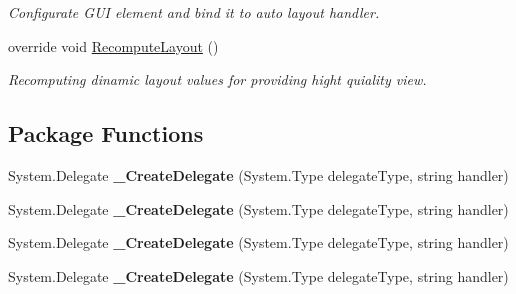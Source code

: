 \begin{DoxyCompactItemize}
\begin{DoxyCompactList}\small\item\em Configurate G\+UI element and bind it to auto layout handler. \end{DoxyCompactList}\item 
override void \mbox{\hyperlink{class_wpf_handler_1_1_u_i_1_1_controls_1_1_flat_text_box_af96bd0b4244565a1ca7a137d56296cda}{Recompute\+Layout}} ()
\begin{DoxyCompactList}\small\item\em Recomputing dinamic layout values for providing hight quiality view. \end{DoxyCompactList}\end{DoxyCompactItemize}
\subsection*{Package Functions}
\begin{DoxyCompactItemize}
\item 
\mbox{\label{class_wpf_handler_1_1_u_i_1_1_controls_1_1_flat_text_box_ad95fca5f96c4d3511458804f21944c87}} 
System.\+Delegate {\bfseries \+\_\+\+Create\+Delegate} (System.\+Type delegate\+Type, string handler)
\item 
\mbox{\label{class_wpf_handler_1_1_u_i_1_1_controls_1_1_flat_text_box_ad95fca5f96c4d3511458804f21944c87}} 
System.\+Delegate {\bfseries \+\_\+\+Create\+Delegate} (System.\+Type delegate\+Type, string handler)
\item 
\mbox{\label{class_wpf_handler_1_1_u_i_1_1_controls_1_1_flat_text_box_ad95fca5f96c4d3511458804f21944c87}} 
System.\+Delegate {\bfseries \+\_\+\+Create\+Delegate} (System.\+Type delegate\+Type, string handler)
\item 
\mbox{\label{class_wpf_handler_1_1_u_i_1_1_controls_1_1_flat_text_box_ad95fca5f96c4d3511458804f21944c87}} 
System.\+Delegate {\bfseries \+\_\+\+Create\+Delegate} (System.\+Type delegate\+Type, string handler)
\end{DoxyCompactItemize}
